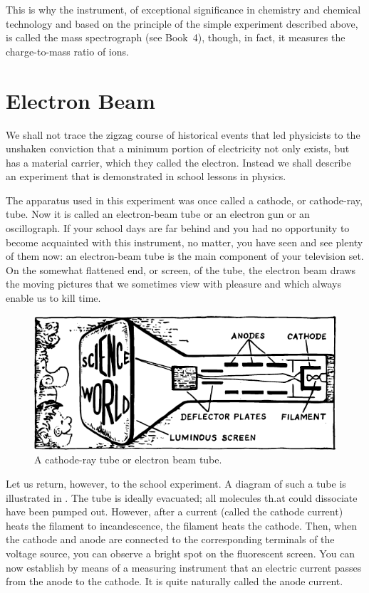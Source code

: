 This is why the instrument, of exceptional significance in chemistry and chemical technology and based on the principle of the simple experiment described above, is called the mass spectrograph (see Book~4), though, in fact, it measures the charge-to-mass ratio of ions.

\section{Electron Beam}

We shall not trace the zigzag course of historical events that led physicists to the unshaken conviction that a minimum portion of electricity not only exists, but has a material carrier, which they called the electron. Instead we shall describe an experiment that is demonstrated in school lessons in physics.

The apparatus used in this experiment was once called a cathode, or cathode-ray, tube. Now it is called an electron-beam tube or an electron gun or an oscillograph. If your school days are far behind and you had no opportunity to become acquainted with this instrument, no matter, you have seen and see plenty of them now: an electron-beam tube is the main component of your television set. On the somewhat flattened end, or screen, of the tube, the electron beam draws the moving pictures that we sometimes view with pleasure and which always enable us to kill time.
\begin{figure}[!ht]
\centering
\includegraphics[width=\textwidth]{figures/fig-02-01.pdf}
\caption{A cathode-ray tube or electron beam tube.}
\label{fig-2.1}
\end{figure}

Let us return, however, to the school experiment. A diagram of such a tube is illustrated in . The tube is ideally evacuated; all molecules th.at could dissociate have been pumped out. However, after a current (called the cathode current) heats the filament to incandescence, the filament heats the cathode. Then, when the cathode and anode are connected to the corresponding terminals of the voltage source, you can observe a bright spot on the fluorescent screen. You can now establish by means of a measuring instrument that an electric current passes from the anode to the cathode. It is quite naturally called the anode current.

